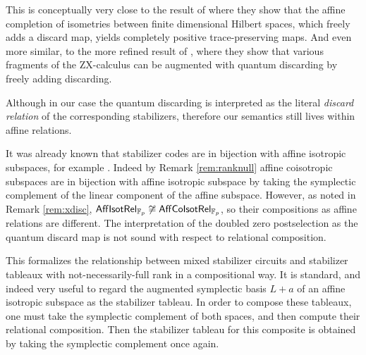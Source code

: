 This is conceptually very close to the result of \cite{huot} where they show that the affine completion of isometries between finite dimensional Hilbert spaces, which freely adds a discard map, yields completely positive trace-preserving maps.  And even more similar, to the more refined result of   \cite{disc}, where they show that various fragments of the ZX-calculus can be augmented with quantum discarding by freely adding discarding. 

Although in our case the quantum discarding is interpreted as the literal {\em discard relation} of the corresponding stabilizers, therefore our semantics still lives within affine relations.








It was already known that stabilizer codes are in bijection with  affine isotropic subspaces, for example \cite[\S A]{gross}.  Indeed by Remark \ref{rem:ranknull} affine coisotropic subspaces are in bijection with affine isotropic subspace by  taking the symplectic complement of the linear component of the affine subspace. However, as noted in Remark  \ref{rem:xdisc}, $\mathsf{Aff}{\sf Isot}\mathsf{Rel}_{\mathbb{F}_p} \not \cong \mathsf{Aff}{\sf Co}{\sf Isot}\mathsf{Rel}_{\mathbb{F}_p}$, so their compositions as affine relations are different. The interpretation of the doubled zero postselection as the quantum discard map is not sound with respect to relational composition.   


This formalizes the relationship between mixed stabilizer circuits and stabilizer tableaux with not-necessarily-full rank in  a compositional way.  It is standard, and indeed very useful to regard the augmented symplectic basis $L+a$ of an affine isotropic subspace as the stabilizer tableau.  In order to compose these tableaux, one must take the symplectic complement of both spaces, and then compute  their relational composition.  Then the stabilizer tableau for this composite is obtained by taking the symplectic complement once again.

